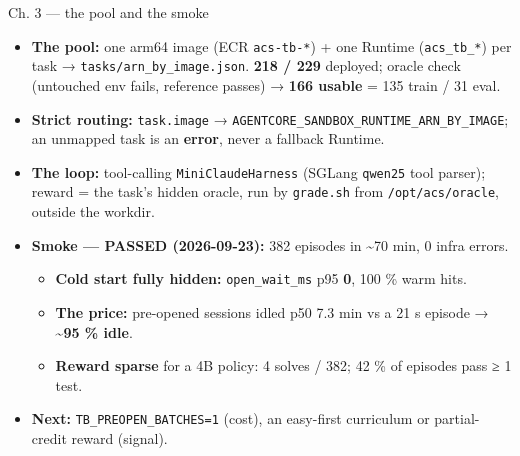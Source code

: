 \documentclass[
  10pt,
  ignorenonframetext,
  aspectratio=169,
  t]{beamer}
\providecommand{\tightlist}{%
  \setlength{\itemsep}{0pt}\setlength{\parskip}{0pt}}
\begin{document}
\begin{frame}{Ch. 3 --- the pool and the smoke}
\protect\hypertarget{ch.-3-the-pool-and-the-smoke}{}
\begin{itemize}
\tightlist
\item
  \textbf{The pool:} one arm64 image (ECR \texttt{acs-tb-*}) + one
  Runtime (\texttt{acs\_tb\_*}) per task →
  \texttt{tasks/arn\_by\_image.json}. \textbf{218 / 229} deployed;
  oracle check (untouched env fails, reference passes) → \textbf{166
  usable} = 135 train / 31 eval.
\item
  \textbf{Strict routing:} \texttt{task.image} →
  \texttt{AGENTCORE\_SANDBOX\_RUNTIME\_ARN\_BY\_IMAGE}; an unmapped task
  is an \textbf{error}, never a fallback Runtime.
\item
  \textbf{The loop:} tool-calling \texttt{MiniClaudeHarness} (SGLang
  \texttt{qwen25} tool parser); reward = the task's hidden oracle, run
  by \texttt{grade.sh} from \texttt{/opt/acs/oracle}, outside the
  workdir.
\item
  \textbf{Smoke --- PASSED (2026-09-23):} 382 episodes in
  \textasciitilde70 min, 0 infra errors.

  \begin{itemize}
  \tightlist
  \item
    \textbf{Cold start fully hidden:} \texttt{open\_wait\_ms} p95
    \textbf{0}, 100 \% warm hits.
  \item
    \textbf{The price:} pre-opened sessions idled p50 7.3 min vs a 21 s
    episode → \textbf{\textasciitilde95 \% idle}.
  \item
    \textbf{Reward sparse} for a 4B policy: 4 solves / 382; 42 \% of
    episodes pass ≥ 1 test.
  \end{itemize}
\item
  \textbf{Next:} \texttt{TB\_PREOPEN\_BATCHES=1} (cost), an easy-first
  curriculum or partial-credit reward (signal).
\end{itemize}
\end{frame}
\end{document}
